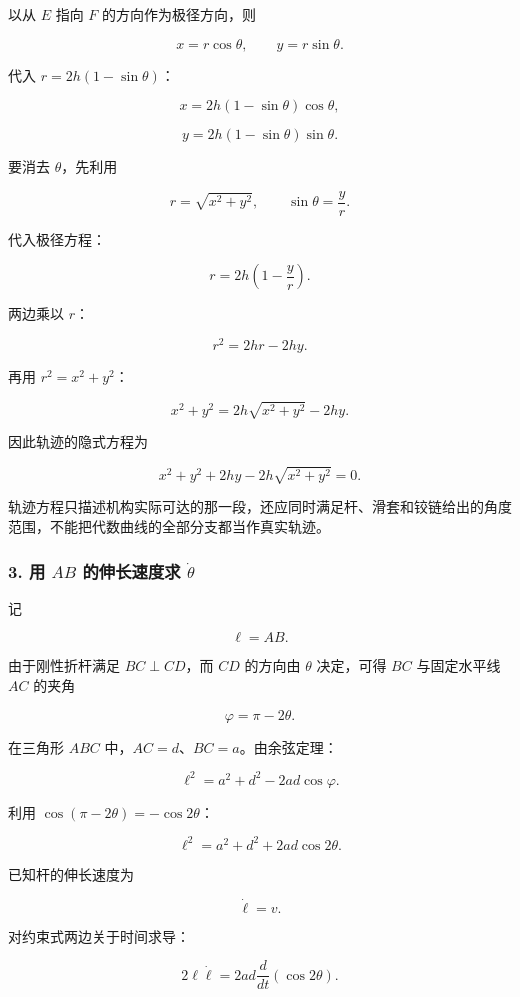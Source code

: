 \documentclass[12pt,a4paper,UTF8]{ctexart}
\begin{document}
以从 \(E\) 指向 \(F\) 的方向作为极径方向，则

\[
x=r\cos\theta,
\qquad
y=r\sin\theta.
\]

代入 \(r=2h(1-\sin\theta)\)：

\[
x=2h(1-\sin\theta)\cos\theta,
\]

\[
y=2h(1-\sin\theta)\sin\theta.
\]

要消去 \(\theta\)，先利用

\[
r=\sqrt{x^2+y^2},
\qquad
\sin\theta=\frac{y}{r}.
\]

代入极径方程：

\[
r=2h\left(1-\frac{y}{r}\right).
\]

两边乘以 \(r\)：

\[
r^2=2hr-2hy.
\]

再用 \(r^2=x^2+y^2\)：

\[
x^2+y^2=2h\sqrt{x^2+y^2}-2hy.
\]

因此轨迹的隐式方程为

\[
\boxed{
x^2+y^2+2hy-2h\sqrt{x^2+y^2}=0
}.
\]

轨迹方程只描述机构实际可达的那一段，还应同时满足杆、滑套和铰链给出的角度范围，不能把代数曲线的全部分支都当作真实轨迹。

\subsubsection{\texorpdfstring{3. 用 \(AB\) 的伸长速度求
\(\dot\theta\)}{3. 用 AB 的伸长速度求 \textbackslash dot\textbackslash theta}}\label{ux7528-ab-ux7684ux4f38ux957fux901fux5ea6ux6c42-dottheta}

记

\[
\ell=AB.
\]

由于刚性折杆满足 \(BC\perp CD\)，而 \(CD\) 的方向由 \(\theta\)
决定，可得 \(BC\) 与固定水平线 \(AC\) 的夹角

\[
\varphi=\pi-2\theta.
\]

在三角形 \(ABC\) 中，\(AC=d\)、\(BC=a\)。由余弦定理：

\[
\ell^2=a^2+d^2-2ad\cos\varphi.
\]

利用 \(\cos(\pi-2\theta)=-\cos2\theta\)：

\[
\boxed{
\ell^2=a^2+d^2+2ad\cos2\theta
}.
\]

已知杆的伸长速度为

\[
\dot\ell=v.
\]

对约束式两边关于时间求导：

\[
2\ell\dot\ell
=2ad\frac{d}{dt}(\cos2\theta).
\]
\end{document}

